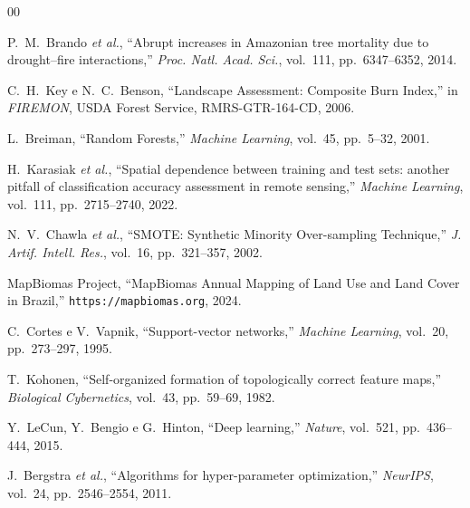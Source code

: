 \documentclass[conference]{IEEEtran}
\begin{document}
\begin{thebibliography}{00}

P.~M.~Brando \textit{et al.},
``Abrupt increases in Amazonian tree mortality due to drought–fire
interactions,''
\textit{Proc. Natl. Acad. Sci.}, vol.~111, pp.~6347--6352, 2014.

C.~H.~Key e N.~C.~Benson,
``Landscape Assessment: Composite Burn Index,''
in \textit{FIREMON}, USDA Forest Service, RMRS-GTR-164-CD, 2006.

L.~Breiman,
``Random Forests,''
\textit{Machine Learning}, vol.~45, pp.~5--32, 2001.

H.~Karasiak \textit{et al.},
``Spatial dependence between training and test sets: another pitfall of
classification accuracy assessment in remote sensing,''
\textit{Machine Learning}, vol.~111, pp.~2715--2740, 2022.

N.~V.~Chawla \textit{et al.},
``SMOTE: Synthetic Minority Over-sampling Technique,''
\textit{J. Artif. Intell. Res.}, vol.~16, pp.~321--357, 2002.

MapBiomas Project,
``MapBiomas Annual Mapping of Land Use and Land Cover in Brazil,''
\texttt{https://mapbiomas.org}, 2024.

C.~Cortes e V.~Vapnik,
``Support-vector networks,''
\textit{Machine Learning}, vol.~20, pp.~273--297, 1995.

T.~Kohonen,
``Self-organized formation of topologically correct feature maps,''
\textit{Biological Cybernetics}, vol.~43, pp.~59--69, 1982.

Y.~LeCun, Y.~Bengio e G.~Hinton,
``Deep learning,''
\textit{Nature}, vol.~521, pp.~436--444, 2015.

J.~Bergstra \textit{et al.},
``Algorithms for hyper-parameter optimization,''
\textit{NeurIPS}, vol.~24, pp.~2546--2554, 2011.

\end{thebibliography}
\end{document}
